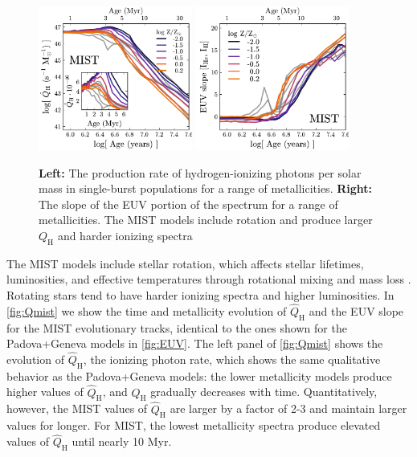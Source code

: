\documentclass[linenumbers, trackchanges, tighten]{aastex61}%
\newcommand{\Fig}[1]{\autoref{fig:#1}}
\newcommand{\QH}{\ensuremath{Q_{\mathrm{H}}}}
\newcommand{\QHat}{\ensuremath{\hat{Q}_{\mathrm{H}}}}
\begin{document}
\begin{figure}[!htbp]
  \begin{centering}
    \includegraphics[width=0.45\textwidth]{f23a.pdf}
    \includegraphics[width=0.45\textwidth]{f23b.pdf}
    \caption{\textbf{Left:} The production rate of hydrogen-ionizing photons per solar mass in single-burst populations for a range of metallicities. \textbf{Right:} The slope of the EUV portion of the spectrum for a range of metallicities. The MIST models include rotation and produce larger \QH{} and harder ionizing spectra }
    \label{fig:Qmist}
  \end{centering}
\end{figure}

The MIST models include stellar rotation, which affects stellar lifetimes, luminosities, and effective temperatures through rotational mixing and mass loss \citep[][for further details]{Choi16}. Rotating stars tend to have harder ionizing spectra and higher luminosities. In \Fig{Qmist} we show the time and metallicity evolution of \QHat{} and the EUV slope for the MIST evolutionary tracks, identical to the ones shown for the Padova+Geneva models in \Fig{EUV}. The left panel of \Fig{Qmist} shows the evolution of \QHat{}, the ionizing photon rate, which shows the same qualitative behavior as the Padova+Geneva models: the lower metallicity models produce higher values of \QHat{}, and \QHat{} gradually decreases with time. Quantitatively, however, the MIST values of \QHat{} are larger by a factor of 2-3 and maintain larger values for longer. For MIST, the lowest metallicity spectra produce elevated values of \QHat{} until nearly 10 Myr. 
\end{document}
